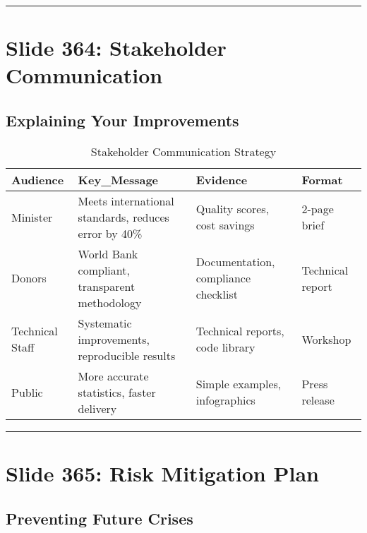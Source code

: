 \documentclass[
]{article}
\begin{document}
\begin{center}\rule{0.5\linewidth}{0.5pt}\end{center}

\section{Slide 364: Stakeholder
Communication}\label{slide-364-stakeholder-communication}

\subsection{Explaining Your
Improvements}\label{explaining-your-improvements}

\begin{longtable}[t]{llll}
\caption{\label{tab:stakeholder-comm}Stakeholder Communication Strategy}\\
\toprule
Audience & Key\_Message & Evidence & Format\\
\midrule
Minister & Meets international standards, reduces error by 40\% & Quality scores, cost savings & 2-page brief\\
Donors & World Bank compliant, transparent methodology & Documentation, compliance checklist & Technical report\\
Technical Staff & Systematic improvements, reproducible results & Technical reports, code library & Workshop\\
Public & More accurate statistics, faster delivery & Simple examples, infographics & Press release\\
\bottomrule
\end{longtable}

\begin{center}\rule{0.5\linewidth}{0.5pt}\end{center}

\section{Slide 365: Risk Mitigation
Plan}\label{slide-365-risk-mitigation-plan}

\subsection{Preventing Future Crises}\label{preventing-future-crises}
\end{document}
